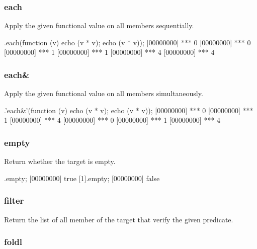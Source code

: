 \subsubsection{each}

Apply the given functional value on all members sequentially.

\begin{urbiscript}
[0, 1, 2].each(function (v) {echo (v * v); echo (v * v)});
[00000000] *** 0
[00000000] *** 0
[00000000] *** 1
[00000000] *** 1
[00000000] *** 4
[00000000] *** 4
\end{urbiscript}

\subsubsection{each\&}

Apply the given functional value on all members simultaneously.

\begin{urbiscript}
[0, 1, 2].'each&'(function (v) {echo (v * v); echo (v * v)});
[00000000] *** 0
[00000000] *** 1
[00000000] *** 4
[00000000] *** 0
[00000000] *** 1
[00000000] *** 4
\end{urbiscript}

\subsubsection{empty}

Return whether the target is empty.

\begin{urbiscript}
[].empty;
[00000000] true
[1].empty;
[00000000] false
\end{urbiscript}

\subsubsection{filter}

Return the list of all member of the target that verify the given
predicate.


\subsubsection{foldl}


